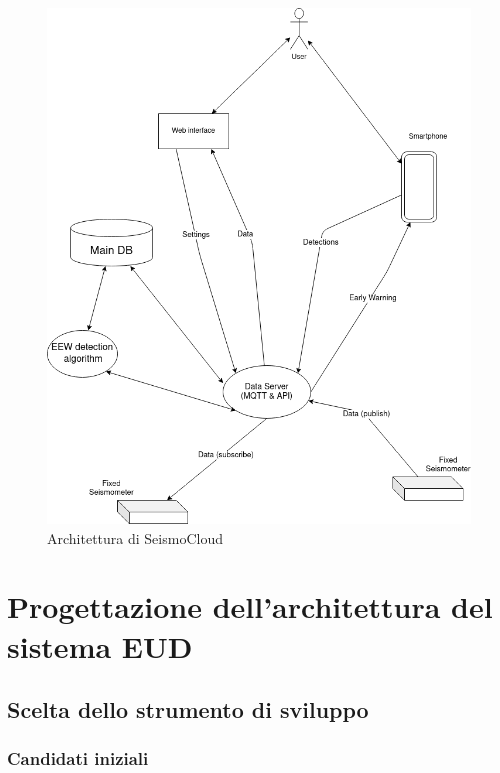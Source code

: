 \documentclass[a4paper,10pt]{memoir}
\begin{document}
\begin{figure}
\caption{Architettura di SeismoCloud}
\label{fig:ArchitetturaSeismoCloud}
\includegraphics[width=1\textwidth]{Chapter-1/architettura-seismocloud.png}
\end{figure}

\clearpage

\chapter{Progettazione dell'architettura del sistema EUD}

\section{Scelta dello strumento di sviluppo}

\subsection{Candidati iniziali}
\end{document}
